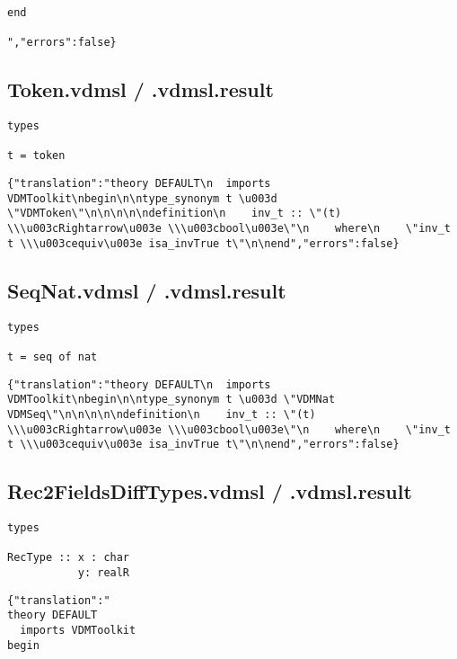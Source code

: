 \begin{appendices}
\begin{lstlisting}
end

","errors":false}
\end{lstlisting}

\subsection{Token.vdmsl / .vdmsl.result}
\begin{lstlisting}
types

t = token
\end{lstlisting}

\begin{lstlisting}
{"translation":"theory DEFAULT\n  imports VDMToolkit\nbegin\n\ntype_synonym t \u003d \"VDMToken\"\n\n\n\n\ndefinition\n    inv_t :: \"(t) \\\u003cRightarrow\u003e \\\u003cbool\u003e\"\n    where\n    \"inv_t t \\\u003cequiv\u003e isa_invTrue t\"\n\nend","errors":false}
\end{lstlisting}

\subsection{SeqNat.vdmsl / .vdmsl.result}
\begin{lstlisting}
types

t = seq of nat
\end{lstlisting}

\begin{lstlisting}
{"translation":"theory DEFAULT\n  imports VDMToolkit\nbegin\n\ntype_synonym t \u003d \"VDMNat VDMSeq\"\n\n\n\n\ndefinition\n    inv_t :: \"(t) \\\u003cRightarrow\u003e \\\u003cbool\u003e\"\n    where\n    \"inv_t t \\\u003cequiv\u003e isa_invTrue t\"\n\nend","errors":false}
\end{lstlisting}

\subsection{Rec2FieldsDiffTypes.vdmsl / .vdmsl.result}
\begin{lstlisting}
types

RecType :: x : char
           y: realR
\end{lstlisting}

\begin{lstlisting}
{"translation":"
theory DEFAULT
  imports VDMToolkit
begin


\end{lstlisting}
\end{appendices}
